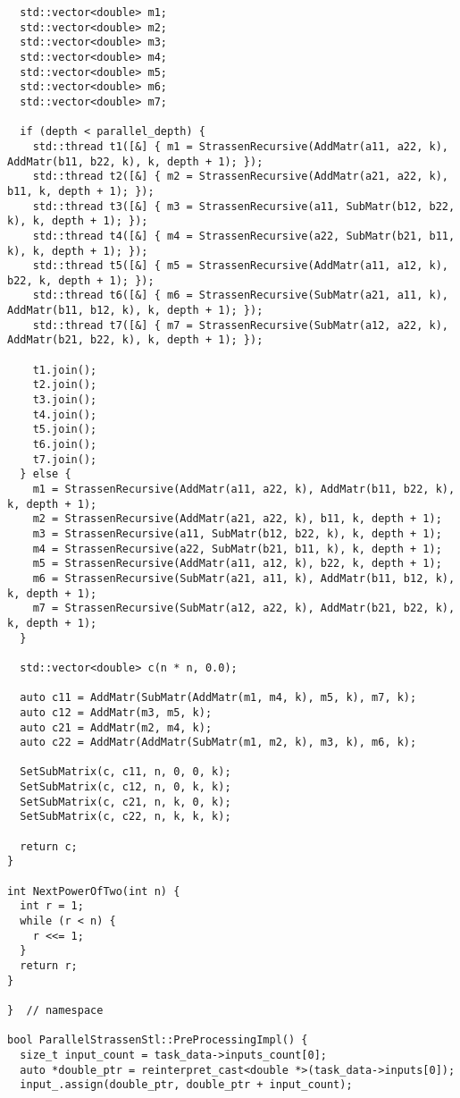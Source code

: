 \documentclass[12pt]{article}
\begin{document}
\begin{lstlisting}
  std::vector<double> m1;
  std::vector<double> m2;
  std::vector<double> m3;
  std::vector<double> m4;
  std::vector<double> m5;
  std::vector<double> m6;
  std::vector<double> m7;

  if (depth < parallel_depth) {
    std::thread t1([&] { m1 = StrassenRecursive(AddMatr(a11, a22, k), AddMatr(b11, b22, k), k, depth + 1); });
    std::thread t2([&] { m2 = StrassenRecursive(AddMatr(a21, a22, k), b11, k, depth + 1); });
    std::thread t3([&] { m3 = StrassenRecursive(a11, SubMatr(b12, b22, k), k, depth + 1); });
    std::thread t4([&] { m4 = StrassenRecursive(a22, SubMatr(b21, b11, k), k, depth + 1); });
    std::thread t5([&] { m5 = StrassenRecursive(AddMatr(a11, a12, k), b22, k, depth + 1); });
    std::thread t6([&] { m6 = StrassenRecursive(SubMatr(a21, a11, k), AddMatr(b11, b12, k), k, depth + 1); });
    std::thread t7([&] { m7 = StrassenRecursive(SubMatr(a12, a22, k), AddMatr(b21, b22, k), k, depth + 1); });

    t1.join();
    t2.join();
    t3.join();
    t4.join();
    t5.join();
    t6.join();
    t7.join();
  } else {
    m1 = StrassenRecursive(AddMatr(a11, a22, k), AddMatr(b11, b22, k), k, depth + 1);
    m2 = StrassenRecursive(AddMatr(a21, a22, k), b11, k, depth + 1);
    m3 = StrassenRecursive(a11, SubMatr(b12, b22, k), k, depth + 1);
    m4 = StrassenRecursive(a22, SubMatr(b21, b11, k), k, depth + 1);
    m5 = StrassenRecursive(AddMatr(a11, a12, k), b22, k, depth + 1);
    m6 = StrassenRecursive(SubMatr(a21, a11, k), AddMatr(b11, b12, k), k, depth + 1);
    m7 = StrassenRecursive(SubMatr(a12, a22, k), AddMatr(b21, b22, k), k, depth + 1);
  }

  std::vector<double> c(n * n, 0.0);

  auto c11 = AddMatr(SubMatr(AddMatr(m1, m4, k), m5, k), m7, k);
  auto c12 = AddMatr(m3, m5, k);
  auto c21 = AddMatr(m2, m4, k);
  auto c22 = AddMatr(AddMatr(SubMatr(m1, m2, k), m3, k), m6, k);

  SetSubMatrix(c, c11, n, 0, 0, k);
  SetSubMatrix(c, c12, n, 0, k, k);
  SetSubMatrix(c, c21, n, k, 0, k);
  SetSubMatrix(c, c22, n, k, k, k);

  return c;
}

int NextPowerOfTwo(int n) {
  int r = 1;
  while (r < n) {
    r <<= 1;
  }
  return r;
}

}  // namespace

bool ParallelStrassenStl::PreProcessingImpl() {
  size_t input_count = task_data->inputs_count[0];
  auto *double_ptr = reinterpret_cast<double *>(task_data->inputs[0]);
  input_.assign(double_ptr, double_ptr + input_count);


\end{lstlisting}
\end{document}

